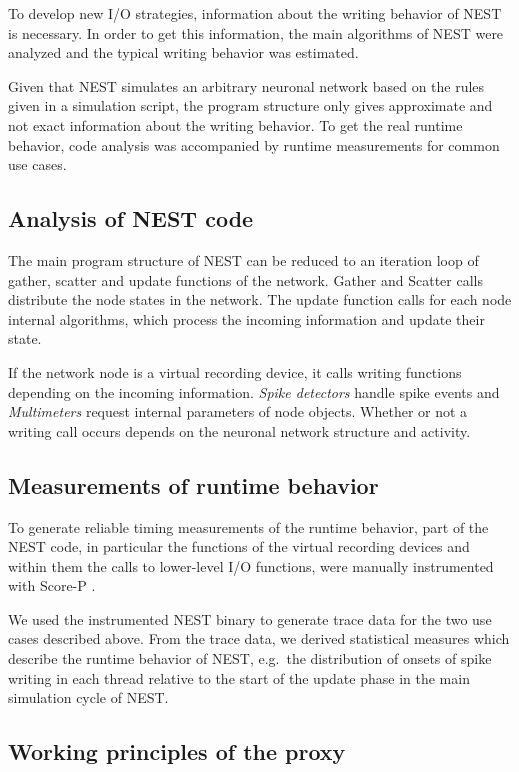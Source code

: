 \documentclass[]{YIC2015}
\begin{document}
To develop new I/O strategies, information about the writing behavior
of NEST is necessary. In order to get this information, the main
algorithms of NEST were analyzed and the typical writing behavior was
estimated.

Given that NEST simulates an arbitrary neuronal network based on the
rules given in a simulation script, the program structure only gives
approximate and not exact information about the writing behavior. To
get the real runtime behavior, code analysis was accompanied by runtime
measurements for common use cases.

\subsection{Analysis of NEST code}

The main program structure of NEST can be reduced to an iteration loop
of gather, scatter and update functions of the network. Gather and
Scatter calls distribute the node states in the network. The update
function calls for each node internal algorithms, which process the
incoming information and update their state.

If the network node is a virtual recording device, it calls writing
functions depending on the incoming information. \emph{Spike
  detectors} handle spike events and \emph{Multimeters} request
internal parameters of node objects. Whether or not a writing call
occurs depends on the neuronal network structure and activity.

\subsection{Measurements of runtime behavior}

To generate reliable timing measurements of the runtime behavior, part
of the NEST code, in particular the functions of the virtual recording
devices and within them the calls to lower-level I/O functions, were
manually instrumented with Score-P \cite{ScoreP}.

We used the instrumented NEST binary to generate trace data for the
two use cases described above. From the trace data, we derived
statistical measures which describe the runtime behavior of NEST,
e.g.~the distribution of onsets of spike writing in each thread
relative to the start of the update phase in the main simulation cycle
of NEST.

\subsection{Working principles of the proxy}
\end{document}
